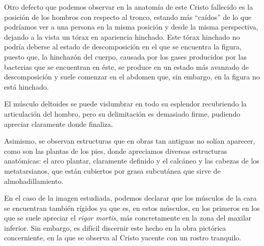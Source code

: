 Otro defecto que podemos observar en la anatomía de este Cristo fallecido es la posición de los hombros con respecto al tronco, estando más ``caídos'' de lo que podríamos ver a una persona en la misma posición y desde la misma perspectiva, dejando a la vista un tórax en apariencia hinchado. Este tórax hinchado no podría deberse al estado de descomposición en el que se encuentra la figura, puesto que, la hinchazón del cuerpo, causada por los gases producidos por las bacterias que se encuentran en éste, se produce en un estado más avanzado de descomposición y suele comenzar en el abdomen que, sin embargo, en la figura no está hinchado.

El músculo deltoides se puede vislumbrar en todo su esplendor recubriendo la articulación del hombro, pero su delimitación es demasiado firme, pudiendo apreciar claramente donde finaliza.

Asimismo, se observan estructuras que en obras tan antiguas no solían aparecer, como son las plantas de los pies, donde apreciamos diversas estructuras anatómicas: el arco plantar, claramente definido y el calcáneo y las cabezas de los metatarsianos, que están cubiertos por grasa subcutánea que sirve de almohadillamiento.

 En el caso de la imagen estudiada, podemos declarar que los músculos de la cara se encuentran también rígidos ya que es, en estos músculos, en los primeros en los que se suele apreciar el \textit{rigor mortis}, más concretamente en la zona del maxilar inferior\cite{RefWorks:60}\cite{RefWorks:56}\cite{RefWorks:55}. Sin embargo, es difícil discernir este hecho en la obra pictórica concerniente, en la que se observa al Cristo yacente con un rostro tranquilo.
